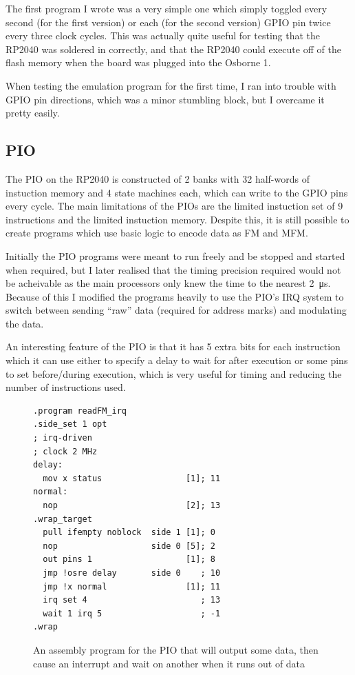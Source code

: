 \documentclass[a4paper]{article}
\begin{document}
The first program I wrote was a very simple one which simply toggled
every second (for the first version) or each (for the second version)
GPIO pin twice every three clock cycles. This was actually quite
useful for testing that the RP2040 was soldered in correctly, and that
the RP2040 could execute off of the flash memory when the board was
plugged into the Osborne 1.

When testing the emulation program for the first time, I ran into
trouble with GPIO pin directions, which was a minor stumbling block,
but I overcame it pretty easily.

\subsection{PIO}

The PIO on the RP2040 is constructed of 2 banks with 32 half-words of
instuction memory and 4 state machines each, which can write to the
GPIO pins every cycle. The main limitations of the PIOs are the
limited instuction set of 9 instructions and the limited instuction
memory. Despite this, it is still possible to create programs which
use basic logic to encode data as FM and MFM.

Initially the PIO programs were meant to run freely and be stopped and
started when required, but I later realised that the timing precision
required would not be acheivable as the main processors only knew the
time to the nearest \qty{2}{\us}. Because of this I modified the
programs heavily to use the PIO's IRQ system to switch between sending
``raw'' data (required for address marks) and modulating the data.

An interesting feature of the PIO is that it has 5 extra bits for each
instruction which it can use either to specify a delay to wait for
after execution or some pins to set before/during execution, which is
very useful for timing and reducing the number of instructions used.

\begin{figure}
\begin{verbatim}
.program readFM_irq
.side_set 1 opt
; irq-driven
; clock 2 MHz
delay:
  mov x status                 [1]; 11
normal:
  nop                          [2]; 13 
.wrap_target
  pull ifempty noblock  side 1 [1]; 0
  nop                   side 0 [5]; 2
  out pins 1                   [1]; 8
  jmp !osre delay       side 0    ; 10
  jmp !x normal                [1]; 11
  irq set 4                       ; 13
  wait 1 irq 5                    ; -1
.wrap
\end{verbatim}
  \caption{An assembly program for the PIO that will output some data,
    then cause an interrupt and wait on another when it runs out of data}
\end{figure}
\end{document}
